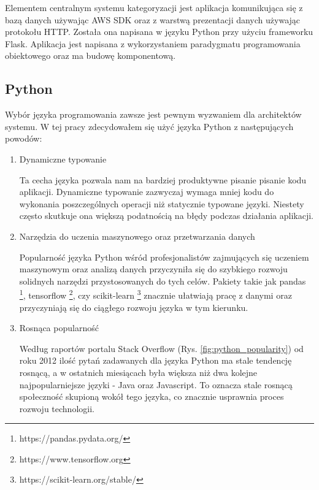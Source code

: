 Elementem centralnym systemu kategoryzacji jest aplikacja komunikująca się z bazą danych używając AWS SDK oraz z warstwą prezentacji danych używając protokołu HTTP. Została ona napisana w języku Python przy użyciu frameworku Flask. Aplikacja jest napisana z wykorzystaniem paradygmatu programowania obiektowego oraz ma budowę komponentową.

\subsection{Python}

Wybór języka programowania zawsze jest pewnym wyzwaniem dla architektów systemu. W tej pracy zdecydowałem się użyć języka Python z następujących powodów:

\begin{enumerate}
    \item Dynamiczne typowanie
    
    Ta cecha języka pozwala nam na bardziej produktywne pisanie pisanie kodu aplikacji. Dynamiczne typowanie zazwyczaj wymaga mniej kodu do wykonania poszczególnych operacji niż statycznie typowane języki. Niestety często skutkuje ona większą podatnością na błędy podczas działania aplikacji.
    
    \item Narzędzia do uczenia maszynowego oraz przetwarzania danych
    
    Popularność języka Python wśród profesjonalistów zajmujących się uczeniem maszynowym oraz analizą danych przyczyniła się do szybkiego rozwoju solidnych narzędzi przystosowanych do tych celów. Pakiety takie jak pandas \footnote{https://pandas.pydata.org/}, tensorflow \footnote{https://www.tensorflow.org}, czy scikit-learn \footnote{https://scikit-learn.org/stable/} znacznie ułatwiają pracę z danymi oraz przyczyniają się do ciągłego rozwoju języka w tym kierunku.
    
    \item Rosnąca popularność
    
    Według raportów portalu Stack Overflow (Rys. \ref{fig:python_popularity}) od roku 2012 ilość pytań zadawanych dla języka Python ma stale tendencję rosnącą, a w ostatnich miesiącach była większa niż dwa kolejne najpopularniejsze języki - Java oraz Javascript. To oznacza stale rosnącą społeczność skupioną wokół tego języka, co znacznie usprawnia proces rozwoju technologii.
    

\end{enumerate}
